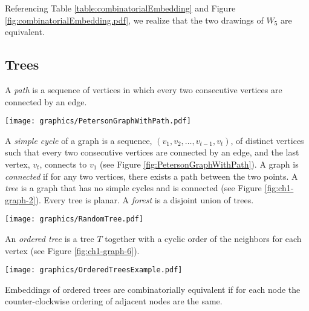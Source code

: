 \documentclass[10pt]{CSUNthesis}
\theoremstyle{plain}%
\theoremstyle{definition}
\theoremstyle{remark}
\begin{document}
Referencing Table \ref{table:combinatorialEmbedding} and Figure \ref{fig:combinatorialEmbedding.pdf}, we realize that the two drawings of $W_5$ are equivalent.  

\subsection{Trees}
A \textit{path} is a sequence of vertices in which every two consecutive vertices are connected by an edge.   
\noindent%
\begin{minipage}{\linewidth}
\begin{center}
\texttt{[image: graphics/PetersonGraphWithPath.pdf]}
\label{fig:PetersonGraphWithPath}
\end{center}
\end{minipage}
A \textit{simple cycle} of a graph is a sequence, $(v_1, v_2, \dots, v_{t-1},v_t)$, of distinct vertices such that every two consecutive vertices are connected by an edge,  and the last vertex, $v_t$, connects to $v_1$ (see Figure \ref{fig:PetersonGraphWithPath}).  
A graph is \textit{connected} if for any two vertices, there exists a path between the two points.
A \textit{tree} is a graph that has no simple cycles and is connected (see Figure \ref{fig:ch1-graph-2}).
Every tree is planar.
A \textit{forest} is a disjoint union of trees.  
\noindent%
\begin{minipage}{\linewidth}
\begin{center}
\texttt{[image: graphics/RandomTree.pdf]}
\label{fig:ch1-graph-2}
\end{center}
\end{minipage}

An \textit{ordered tree} is a tree $T$ together with a cyclic order of the neighbors for each vertex (see Figure \ref{fig:ch1-graph-6}).
\noindent%
\begin{minipage}{\linewidth}
\begin{center}
    \texttt{[image: graphics/OrderedTreesExample.pdf]}
    \label{fig:ch1-graph-6}
\end{center}
\end{minipage}

Embeddings of ordered trees are combinatorially equivalent if for each node the counter-clockwise ordering of adjacent nodes are the same. 
\end{document}
